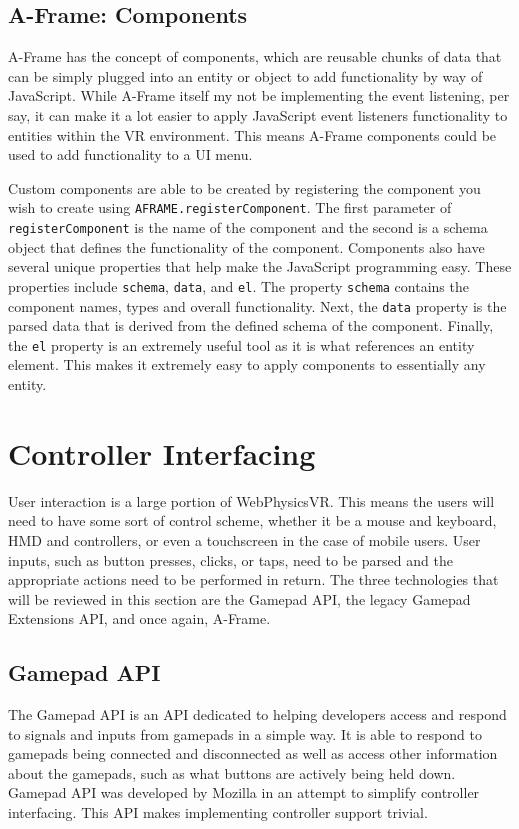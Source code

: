 \documentclass[draftclsnofoot,onecolumn,letterpaper,10pt]{article}
\begin{document}
\subsection{A-Frame: Components}
A-Frame has the concept of components, which are reusable chunks of data that can be simply plugged into an entity or object to add functionality by way of JavaScript. While A-Frame itself my not be implementing the event listening, per say, it can make it a lot easier to apply JavaScript event listeners functionality to entities within the VR environment. This means A-Frame components could be used to add functionality to a UI menu.\cite{aframe5} 

Custom components are able to be created by registering the component you wish to create using \texttt{AFRAME.registerComponent}. The first parameter of \texttt{registerComponent} is the name of the component and the second is a schema object that defines the functionality of the component. Components also have several unique properties that help make the JavaScript programming easy. These properties include \texttt{schema}, \texttt{data}, and \texttt{el}. The property \texttt{schema} contains the component names, types and overall functionality. Next, the \texttt{data} property is the parsed data that is derived from the defined schema of the component. Finally, the \texttt{el} property is an extremely useful tool as it is what references an entity element. This makes it extremely easy to apply components to essentially any entity.\cite{aframe6}

\section{Controller Interfacing}
User interaction is a large portion of WebPhysicsVR. This means the users will need to have some sort of control scheme, whether it be a mouse and keyboard, HMD and controllers, or even a touchscreen in the case of mobile users. User inputs, such as button presses, clicks, or taps, need to be parsed and the appropriate actions need to be performed in return. The three technologies that will be reviewed in this section are the Gamepad API, the legacy Gamepad Extensions API, and once again, A-Frame.

\subsection{Gamepad API}
The Gamepad API is an API dedicated to helping developers access and respond to signals and inputs from gamepads in a simple way. It is able to respond to gamepads being connected and disconnected as well as access other information about the gamepads, such as what buttons are actively being held down. Gamepad API was developed by Mozilla in an attempt to simplify controller interfacing. This API makes implementing controller support trivial. 
\end{document}
